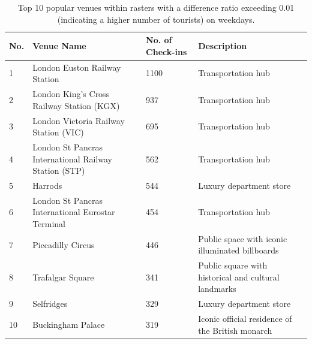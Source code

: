 \documentclass{article}
\theoremstyle{definition}
\theoremstyle{remark}
\begin{document}
\begin{table}[!h]
\centering
\caption{\label{tab:popular_venues_touristspop_weekday}Top 10 popular venues within rasters with a difference ratio exceeding 0.01 (indicating a higher number of tourists) on weekdays.}
\begin{adjustbox}{max width=\textwidth, margin=0cm}
\begin{threeparttable}
\begin{tabular}{lp{5cm}lp{4cm}} \hline
No. & Venue Name & No. of Check-ins & Description \\ \hline
1 & London Euston Railway Station & 1100 & Transportation hub \\
2 & London King's Cross Railway Station (KGX) & 937 & Transportation hub \\
3 & London Victoria Railway Station (VIC) & 695 & Transportation hub \\
4 & London St Pancras International Railway Station (STP) & 562 & Transportation hub \\
5 & Harrods & 544 & Luxury department store \\
6 & London St Pancras International Eurostar Terminal & 454 & Transportation hub \\
7 & Piccadilly Circus & 446 & Public space with iconic illuminated billboards \\
8 & Trafalgar Square & 341 & Public square with historical and cultural landmarks \\
9 & Selfridges & 329 & Luxury department store \\
10 & Buckingham Palace & 319 & Iconic official residence of the British monarch \\ \hline
\end{tabular}
\end{threeparttable}
\end{adjustbox}
\end{table}
\end{document}
